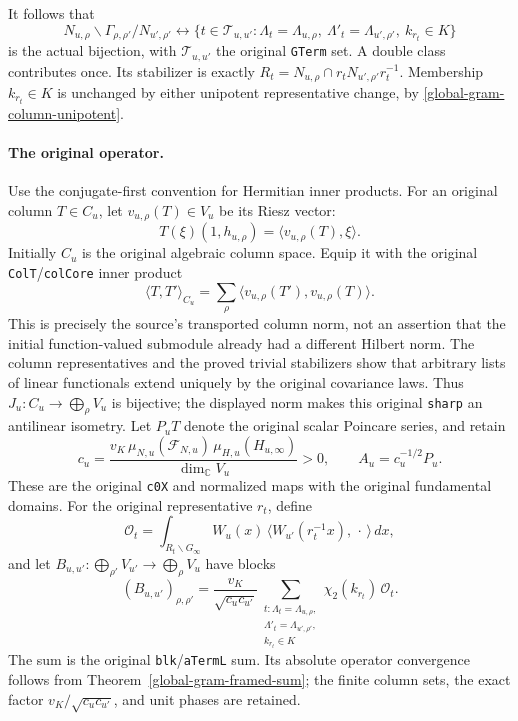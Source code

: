 It follows that
\begin{equation}\label{global-gram-original-return-bijection}
 N_{u,\rho}\backslash\Gamma_{\rho,\rho'} /N_{u',\rho'}
 \longleftrightarrow
 \{t\in\mathcal T_{u,u'}:
    \Lambda_t=\Lambda_{u,\rho},\
    \Lambda'_t=\Lambda_{u',\rho'},\ k_{r_t}\in K\}
\end{equation}
is the actual bijection, with $\mathcal T_{u,u'}$ the original
\texttt{GTerm} set.  A double class contributes once.  Its
stabilizer is exactly
$R_t=N_{u,\rho}\cap r_tN_{u',\rho'}r_t^{-1}$.
Membership $k_{r_t}\in K$ is unchanged by either unipotent
representative change, by \eqref{global-gram-column-unipotent}.

\paragraph{The original operator.}
Use the conjugate-first convention for Hermitian inner products.
For an original column $T\in C_u$, let $v_{u,\rho}(T)\in V_u$ be
its Riesz vector:
\[
 T(\xi)(1,h_{u,\rho})=\langle v_{u,\rho}(T),\xi\rangle.
\]
Initially $C_u$ is the original algebraic column space.  Equip it
with the original \texttt{ColT}/\texttt{colCore} inner product
\[
 \langle T,T'\rangle_{C_u}=
       \sum_\rho\langle v_{u,\rho}(T'),v_{u,\rho}(T)\rangle.
\]
This is precisely the source's transported column norm, not an
assertion that the initial function-valued submodule already had
a different Hilbert norm.  The column representatives and the
proved trivial stabilizers show that arbitrary lists of linear
functionals extend uniquely by the original covariance laws.
Thus $J_u:C_u\longrightarrow\bigoplus_\rho V_u$ is bijective;
the displayed norm makes this original \texttt{sharp} an
antilinear isometry.\cite{global-gram-period-source}  Let
$P_uT$ denote the original scalar Poincare series, and retain
\[
 c_u=\frac{v_K\,\mu_{N,u}(\mathcal F_{N,u})\,
                    \mu_{H,u}(H_{u,\infty})}{\dim_{\mathbb C}V_u}>0,
 \qquad A_u=c_u^{-1/2}P_u.
\]
These are the original \texttt{c0X} and normalized maps with the
original fundamental domains.  For the original representative
$r_t$, define
\[
 \mathcal O_t=\int_{R_t\backslash G_\infty}
 W_u(x)\,\langle W_{u'}(r_t^{-1}x),\,\cdot\,\rangle\,dx,
\]
and let $B_{u,u'}:\bigoplus_{\rho'}V_{u'}\to\bigoplus_\rho V_u$
have blocks
\begin{equation}\label{global-gram-actual-block}
 (B_{u,u'})_{\rho,\rho'}=
 \frac{v_K}{\sqrt{c_uc_{u'}}}
 \sum_{\substack{t:\Lambda_t=\Lambda_{u,\rho},\\
                    \Lambda'_t=\Lambda_{u',\rho'},\\
                    k_{r_t}\in K}}
       \chi_2(k_{r_t})\,\mathcal O_t.
\end{equation}
The sum is the original \texttt{blk}/\texttt{aTermL} sum.
Its absolute operator convergence follows from
Theorem~\ref{global-gram-framed-sum}; the finite column sets,
the exact factor $v_K/\sqrt{c_uc_{u'}}$, and unit phases are retained.


